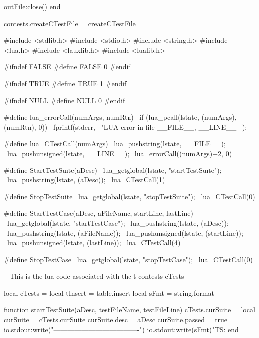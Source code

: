   outFile:close()
end

contests.createCTestFile = createCTestFile
\stopLuaCode

\startCHeader
#include <stdlib.h>
#include <stdio.h>
#include <string.h>
#include <lua.h>
#include <lauxlib.h>
#include <lualib.h>

#ifndef FALSE
#define FALSE 0
#endif

#ifndef TRUE
#define TRUE 1
#endif

#ifndef NULL
#define NULL 0
#endif

#define lua_errorCall(numArgs, numRtn)             \
  if (lua_pcall(lstate, (numArgs), (numRtn), 0)) { \
    fprintf(stderr,                                \
      "LUA error in file %
      __FILE__, __LINE__                           \
    );                                             \
  }
  
#define lua_CTestCall(numArgs)        \
  lua_pushstring(lstate, __FILE__);   \
  lua_pushunsigned(lstate, __LINE__); \
  lua_errorCall((numArgs)+2, 0)

#define StartTestSuite(aDesc)              \
  lua_getglobal(lstate, "startTestSuite"); \
  lua_pushstring(lstate, (aDesc));         \
  lua_CTestCall(1)

#define StopTestSuite                     \
  lua_getglobal(lstate, "stopTestSuite"); \
  lua_CTestCall(0)

#define StartTestCase(aDesc, aFileName, startLine, lastLine) \
  lua_getglobal(lstate, "startTestCase");                    \
  lua_pushstring(lstate, (aDesc));                           \
  lua_pushstring(lstate, (aFileName));                       \
  lua_pushunsigned(lstate, (startLine));                     \
  lua_pushunsigned(lstate, (lastLine));                      \
  lua_CTestCall(4)

#define StopTestCase                     \
  lua_getglobal(lstate, "stopTestCase"); \
  lua_CTestCall(0)

\stopCHeader

\setLuaCodeStream{cTests}
\startLuaCode
-- This is the lua code associated with the t-contests-cTests

local cTests  = { }
local tInsert = table.insert
local sFmt    = string.format

function startTestSuite(aDesc, testFileName, testFileLine)
  cTests.curSuite = { }
  local curSuite  = cTests.curSuite
  curSuite.desc   = aDesc
  curSuite.passed = true
  io.stdout:write("\n-------------------------------------\n")
  io.stdout:write(sFmt("TS: %
end

